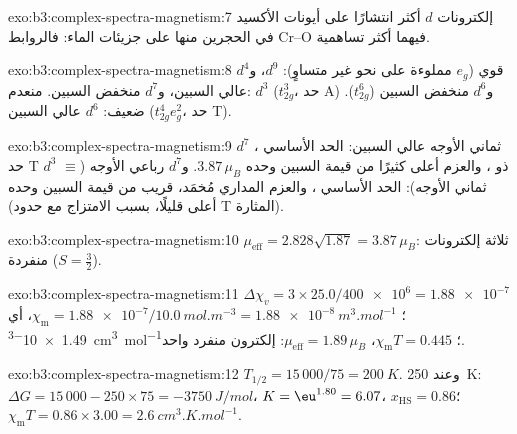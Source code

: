 \begin{solution}{exo:b3:complex-spectra-magnetism:7}
إلكترونات $d$ أكثر انتشارًا على أيونات الأكسيد في الحجرين منها على
جزيئات الماء: فالروابط Cr--O فيهما أكثر تساهمية.
\end{solution}

\begin{solution}{exo:b3:complex-spectra-magnetism:8}
قوي ($e_g$ مملوءة على نحو غير متساوٍ): $d^9$، و$d^4$ عالي السبين، و$d^7$ منخفض السبين. منعدم: $d^3$ ($t_{2g}^3$، حد A) 
و$d^6$ منخفض السبين ($t_{2g}^6$). ضعيف: $d^6$ عالي السبين ($t_{2g}^4e_g^2$، حد T).
\end{solution}

\begin{solution}{exo:b3:complex-spectra-magnetism:9}
$d^7$ ثماني الأوجه عالي السبين: الحد الأساسي ، حد T ذو ،
والعزم أعلى كثيرًا من قيمة السبين وحده $3.87\,\mu_B$. و$d^7$ رباعي الأوجه ($\equiv$ $d^3$ ثماني الأوجه): الحد
الأساسي ، والعزم المداري مُخمَد، قريب من قيمة السبين وحده (أعلى قليلًا، بسبب
الامتزاج مع حدود T المثارة).
\end{solution}

\begin{solution}{exo:b3:complex-spectra-magnetism:10}
$\mu_{\mathrm{eff}} = 2.828\sqrt{1.87} = 3.87\,\mu_B$: ثلاثة إلكترونات منفردة ($S = \frac32$).
\end{solution}

\begin{solution}{exo:b3:complex-spectra-magnetism:11}
$\Delta\chi_v = 3 \times 25.0/\num{400e6} = \num{1.88e-7}$؛ $\chi_{\mathrm m} = \num{1.88e-7}/\qty{10.0}{mol.m^{-3}} = \qty{1.88e-8}{m^3.mol^{-1}}$، أي
\qty{1.49e-3}{cm^3.mol^{-1}}؛ $\chi_{\mathrm m}T = 0.445$، $\mu_{\mathrm{eff}} = 1.89\,\mu_B$: إلكترون منفرد واحد.
\end{solution}

\begin{solution}{exo:b3:complex-spectra-magnetism:12}
$T_{1/2} = 15\,000/75 = \qty{200}{K}$. وعند \qty{250}{K}: $\Delta G = 15\,000 - 250 \times 75 = \qty{-3750}{J/mol}$، $K = \eu^{1.80} = 6.07$،
$x_{\mathrm{HS}} = 0.86$؛ $\chi_{\mathrm m}T = 0.86 \times 3.00 = \qty{2.6}{cm^3.K.mol^{-1}}$.
\end{solution}

